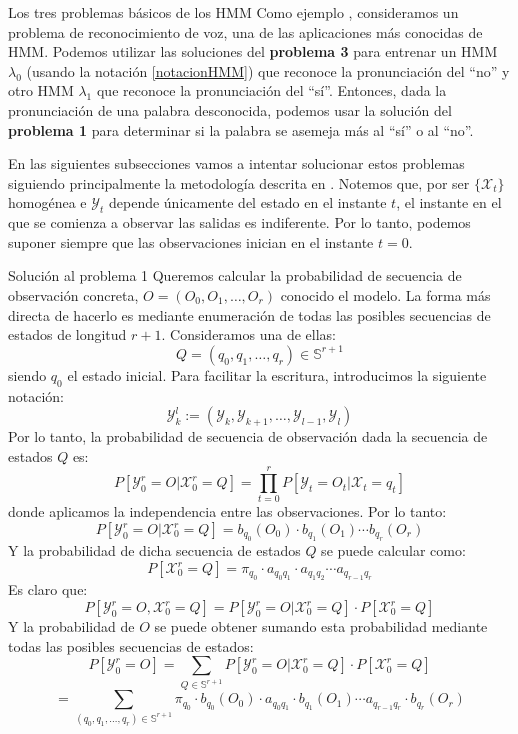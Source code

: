 \begin{section}{Los tres problemas básicos de los HMM}
Como ejemplo , consideramos un problema de reconocimiento de voz, una de las aplicaciones más conocidas de HMM. Podemos utilizar las soluciones del \textbf{problema 3} para entrenar un HMM $\lambda_0$ (usando la notación \eqref{notacionHMM}) que reconoce la pronunciación del \enquote{no} y otro HMM $\lambda_1$ que reconoce la pronunciación del \enquote{sí}. Entonces, dada la pronunciación de una palabra desconocida, podemos usar la solución del \textbf{problema 1} para determinar si la palabra se asemeja más al \enquote{sí} o al \enquote{no}.  

En las siguientes subsecciones vamos a intentar solucionar estos problemas siguiendo principalmente la metodología descrita en \cite{Rabiner}. Notemos que, por ser $\{\mathcal{X}_t\}$ homogénea e $\mathcal{Y}_t$ depende únicamente del estado en el instante $t$, el instante en el que se comienza a observar las salidas es indiferente. Por lo tanto, podemos suponer siempre que las observaciones inician en el instante $t=0$.

\begin{subsection}{Solución al problema 1}
Queremos calcular la probabilidad de secuencia de observación concreta, $O=(O_0,O_1,\dots, O_r)$ conocido el modelo. La forma más directa de hacerlo es mediante enumeración de todas las posibles secuencias de estados de longitud $r+1$. Consideramos una de ellas:
\[Q=(q_0 , q_1 , \dots , q_r)\in\mathbb{S}^{r+1}\]
siendo $q_0$ el estado inicial. Para facilitar la escritura, introducimos la siguiente notación:
\[\mathcal{Y}_k^l:=(\mathcal{Y}_{k},\mathcal{Y}_{k+1},\dots,\mathcal{Y}_{l-1},\mathcal{Y}_{l})\]
Por lo tanto, la probabilidad de secuencia de observación dada la secuencia de estados $Q$ es:
\[P[\mathcal{Y}_0^r=O|\mathcal{X}_0^r=Q]=\prod_{t=0}^r P[\mathcal{Y}_{t}=O_t|\mathcal{X}_{t}=q_t]\]
donde aplicamos la independencia entre las observaciones. Por lo tanto:
\[P[\mathcal{Y}_0^r=O|\mathcal{X}_0^r=Q]=b_{q_0}(O_0)\cdot b_{q_1}(O_1)\cdots b_{q_r}(O_r)\]
Y la probabilidad de dicha secuencia de estados $Q$ se puede calcular como:
\[P[\mathcal{X}_0^r=Q]=\pi_{q_0}\cdot a_{q_0q_1}\cdot a_{q_1q_2}\cdots a_{q_{r-1}q_r} \]
Es claro que:
\[P[\mathcal{Y}_0^r=O,\mathcal{X}_0^r=Q]=P[\mathcal{Y}_0^r=O|\mathcal{X}_0^r=Q]\cdot P[\mathcal{X}_0^r=Q] \]
Y la probabilidad de $O$ se puede obtener sumando esta probabilidad mediante todas las posibles secuencias de estados:
\[P[\mathcal{Y}_0^r=O]=\sum_{Q\in\mathbb{S}^{r+1}}P[\mathcal{Y}_0^r=O|\mathcal{X}_0^r=Q]\cdot P[\mathcal{X}_0^r=Q]\]
\[=\sum_{(q_0 , q_1 , \dots , q_r)\in\mathbb{S}^{r+1}}\pi_{q_0}\cdot b_{q_0}(O_0)\cdot a_{q_0q_1}\cdot b_{q_1}(O_1)\cdots a_{q_{r-1}q_r}\cdot b_{q_r}(O_r)\]


\end{subsection}
\end{section}
